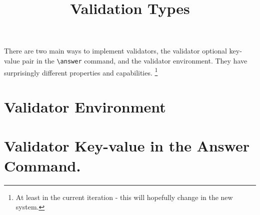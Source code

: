 \documentclass{ximera}
\title{Validation Types}
\begin{document}
\begin{abstract}
\end{abstract}
\maketitle

There are two main ways to implement validators, the validator optional key-value pair in the \verb|\answer| command, and the validator environment. They have surprisingly different properties and capabilities.%
\footnote{At least in the current iteration - this will hopefully change in the new system.}

\section*{Validator Environment}



\section*{Validator Key-value in the Answer Command.}
\end{document}
